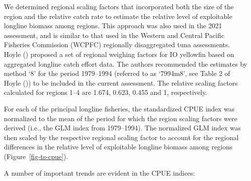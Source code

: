 \documentclass[
]{scrartcl}
\begin{document}
We determined regional scaling factors that incorporated both the size
of the region and the relative catch rate to estimate the relative level
of exploitable longline biomass among regions. This approach was also
used in the 2021 assessment, and is similar to that used in the Western
and Central Pacific Fisheries Commission (WCPFC) regionally
disaggregated tuna assessments. Hoyle
() proposed a set of
regional weighing factors for IO yellowfin based on aggregated longline
catch effort data. The authors recommended the estimates by method `8'
for the period 1979--1994 (referred to as `7994m8', see Table 2 of Hoyle
()) to be included in
the current assessment. The relative scaling factors calculated for
regions 1--4 are 1.674, 0.623, 0.455 and 1, respectively.

For each of the principal longline fisheries, the standardized CPUE
index was normalized to the mean of the period for which the region
scaling factors were derived (i.e., the GLM index from 1979--1994). The
normalized GLM index was then scaled by the respective regional scaling
factor to account for the regional differences in the relative level of
exploitable longline biomass among regions (Figure~\ref{fig-ts-cpue}).

A number of important trends are evident in the CPUE indices:
\end{document}
